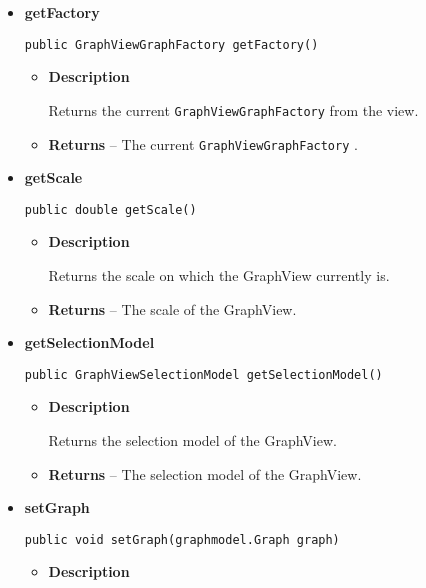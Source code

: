 {{{{{{{\begin{itemize}
{\begin{itemize}
{Adds a grid to the GraphView, on which the dragging can be mapped.
}
\end{itemize}
}%
\item{ 
{\bf  getFactory}\\
\begin{lstlisting}[frame=none]
public GraphViewGraphFactory getFactory()\end{lstlisting} %
\begin{itemize}
\item{
{\bf  Description}

Returns the current \texttt{\small GraphViewGraphFactory}{\small 
{}} from the view.
}
\item{{\bf  Returns} -- 
The current \texttt{\small GraphViewGraphFactory}{\small 
{}}. 
}%
\end{itemize}
}%
\item{ 
{\bf  getScale}\\
\begin{lstlisting}[frame=none]
public double getScale()\end{lstlisting} %
\begin{itemize}
\item{
{\bf  Description}

Returns the scale on which the GraphView currently is.
}
\item{{\bf  Returns} -- 
The scale of the GraphView. 
}%
\end{itemize}
}%
\item{ 
{\bf  getSelectionModel}\\
\begin{lstlisting}[frame=none]
public GraphViewSelectionModel getSelectionModel()\end{lstlisting} %
\begin{itemize}
\item{
{\bf  Description}

Returns the selection model of the GraphView.
}
\item{{\bf  Returns} -- 
The selection model of the GraphView. 
}%
\end{itemize}
}%
\item{ 
{\bf  setGraph}\\
\begin{lstlisting}[frame=none]
public void setGraph(graphmodel.Graph graph)\end{lstlisting} %
\begin{itemize}
\item{
{\bf  Description}

}
\end{itemize}}
\end{itemize}}}}}}}}
